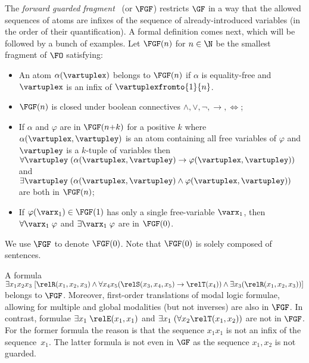 The \emph{forward guarded fragment}~\cite[Sec. 3.1]{Bednarczyk21} (or $\FGF$) restricts $\GF$ in a way that the allowed sequences of atoms are infixes of the sequence of already-introduced variables (in the order of their quantification).
A formal definition comes next, which will be followed by a bunch of examples.
Let $\FGF(n)$ for $n \in \N$ be the smallest fragment of $\FO$ satisfying:
\begin{itemize}\itemsep0em
    \item An atom $\alpha(\vartuplex)$ belongs to $\FGF(n)$ if $\alpha$ is equality-free and $\vartuplex$ is an infix of $\vartuplexfromto{1}{n}$.
    \item $\FGF(n)$ is closed under boolean connectives $\land, \lor, \neg, \to, \iff$;
    \item If $\alpha$ and $\varphi$ are in $\FGF(n{+}k)$ for a positive $k$ where $\alpha(\vartuplex, \vartupley)$ is an atom containing all free variables of $\varphi$ and $\vartupley$ is a $k$-tuple of variables then $\forall{\vartupley} \; (\alpha(\vartuplex, \vartupley) \to \varphi(\vartuplex, \vartupley))$ and $\exists{\vartupley} \; (\alpha(\vartuplex, \vartupley) \land \varphi(\vartuplex, \vartupley))$ are both in $\FGF(n)$;
    \item If $\varphi(\varx_1) \in \FGF(1)$ has only a single free-variable $\varx_1$, then $\forall{\varx_1}\; \varphi$ and $\exists{\varx_1}\; \varphi$ are in $\FGF(0)$.
\end{itemize}
We use $\FGF$ to denote $\FGF(0)$. Note that $\FGF(0)$ is solely composed of sentences.

\begin{example}
A formula $\exists{x_1x_{2}x_{3}}\; [\relR(x_{1}, x_{2}, x_{3}) \land \forall{x_{4}x_{5}}(\relS(x_{3}, x_{4}, x_{5}) \to \relT(x_{4})) \land \exists{x_{3}}(\relR(x_{1}, x_{2}, x_{3}))]$ belongs to $\FGF$.
Moreover, first-order translations of modal logic formulae, allowing for multiple and global modalities (but not inverses) are also in $\FGF$.
In contrast, formulae $\exists{x_{1}}\; \relE(x_{1}, x_{1})$ and $\exists{x_{1}}\; (\forall{x_{2}} \relT(x_{1}, x_{2}))$ are not in $\FGF$.
For the former formula the reason is that the sequence $x_1x_1$ is not an infix of the sequence~$x_1$.
The latter formula is not even in $\GF$ as the sequence $x_{1}, x_{2}$ is not guarded.
\end{example}
